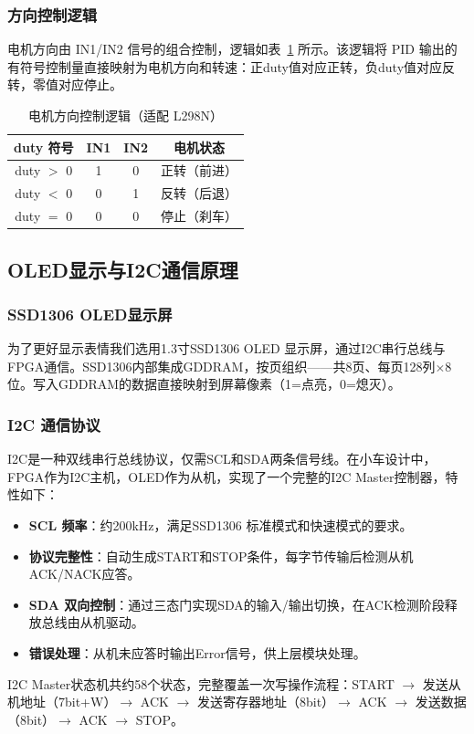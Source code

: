 \documentclass[12pt,a4paper]{ctexart}
\begin{document}
\subsubsection{方向控制逻辑}

电机方向由 IN1/IN2 信号的组合控制，逻辑如表~\ref{tab:motor_logic} 所示。该逻辑将 PID 输出的有符号控制量直接映射为电机方向和转速：正duty值对应正转，负duty值对应反转，零值对应停止。

\begin{table}[H]
\centering
\caption{电机方向控制逻辑（适配 L298N）}
\label{tab:motor_logic}
\begin{tabular}{cccc}
\toprule
\textbf{duty 符号} & \textbf{IN1} & \textbf{IN2} & \textbf{电机状态} \\
\midrule
duty $>$ 0  & 1 & 0 & 正转（前进） \\
duty $<$ 0  & 0 & 1 & 反转（后退） \\
duty $=$ 0  & 0 & 0 & 停止（刹车） \\
\bottomrule
\end{tabular}
\end{table}

\subsection{OLED显示与I2C通信原理}

\subsubsection{SSD1306 OLED显示屏}

为了更好显示表情我们选用1.3寸SSD1306 OLED 显示屏，通过I2C串行总线与FPGA通信。SSD1306内部集成GDDRAM，按页组织——共8页、每页128列$\times$8位。写入GDDRAM的数据直接映射到屏幕像素（1=点亮，0=熄灭）。

\subsubsection{I2C 通信协议}

I2C是一种双线串行总线协议，仅需SCL和SDA两条信号线。在小车设计中，FPGA作为I2C主机，OLED作为从机，实现了一个完整的I2C Master控制器，特性如下：

\begin{itemize}
    \item \textbf{SCL 频率}：约200kHz，满足SSD1306 标准模式和快速模式的要求。
    \item \textbf{协议完整性}：自动生成START和STOP条件，每字节传输后检测从机ACK/NACK应答。
    \item \textbf{SDA 双向控制}：通过三态门实现SDA的输入/输出切换，在ACK检测阶段释放总线由从机驱动。
    \item \textbf{错误处理}：从机未应答时输出Error信号，供上层模块处理。
\end{itemize}
I2C Master状态机共约58个状态，完整覆盖一次写操作流程：START $\to$ 发送从机地址（7bit+W）$\to$ ACK $\to$ 发送寄存器地址（8bit）$\to$ ACK $\to$ 发送数据（8bit）$\to$ ACK $\to$ STOP。
\end{document}
